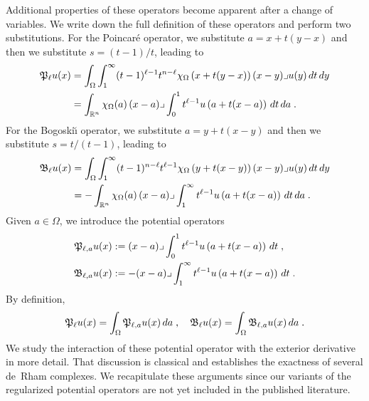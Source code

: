 \documentclass[12pt,a4paper]{article}
\begin{document}
Additional properties of these operators become apparent after a change of variables. 
We write down the full definition of these operators and perform two substitutions.
For the Poincar\'e operator, we substitute $a = x + t(y-x)$ and then we substitute $s = (t-1)/t$,
leading to 
\begin{align*}
    {\mathfrak P}_{\ell} u(x) 
    &= 
    \int_{\Omega} \int_{1}^\infty (t-1)^{\ell-1}t^{n-\ell} 
    \chi_{\Omega}\left(x+t(y-x)\right) 
    (x-y)\lrcorner u(y) \,dt\,dy 
    \\
    &=
    \int_{{\mathbb R}^{n}} \chi_{\Omega}(a) \,(x-a)\lrcorner \int_{0}^{1} t^{\ell-1} u\left(a+t(x-a)\right)\,dt\,da\;
    .
\end{align*}
For the Bogoski\u{\i} operator, we substitute $a = y + t(x-y)$ and then we substitute $s = t/(t-1)$,
leading to 
\begin{align*}
    {\mathfrak B}_{\ell} u(x) 
    &= 
    \int_{\Omega} \int_{1}^\infty (t-1)^{n-\ell}t^{\ell-1} 
    \chi_{\Omega}\left(y+t(x-y)\right) 
    (x-y)\lrcorner u(y) \,dt\,dy 
    \\
    &=
    - \int_{{\mathbb R}^{n}} \chi_{\Omega}(a) \,(x-a)\lrcorner \int_{1}^\infty t^{\ell-1} u\left(a+t(x-a)\right)\,dt\,da\;
    .
\end{align*}
% 
Given $a \in \Omega$, we introduce the potential operators 
\begin{align*}
    {\mathfrak P}_{\ell,a} u(x) 
    &:= 
    (x-a)\lrcorner \int_{0}^{1} t^{\ell-1} u\left(a+t(x-a)\right)\,dt\;
    ,
    \\
    {\mathfrak B}_{\ell,a} u(x) 
    &:= 
    - (x-a)\lrcorner \int_{1}^\infty t^{\ell-1} u\left(a+t(x-a)\right)\,dt\;
    .
\end{align*}
By definition,
\begin{align*}
    {\mathfrak P}_{\ell} u(x) 
    =
    \int_{\Omega} {\mathfrak P}_{\ell,a} u(x) \,da\;,
    \quad 
    {\mathfrak B}_{\ell} u(x) 
    =
    \int_{\Omega} {\mathfrak B}_{\ell,a} u(x) \,da\;
    .
\end{align*}
We study the interaction of these potential operator with the exterior derivative in more detail.
% 
That discussion is classical and establishes the exactness of several de~Rham complexes. 
We recapitulate these arguments since our variants of the regularized potential operators 
are not yet included in the published literature. 
\end{document}
